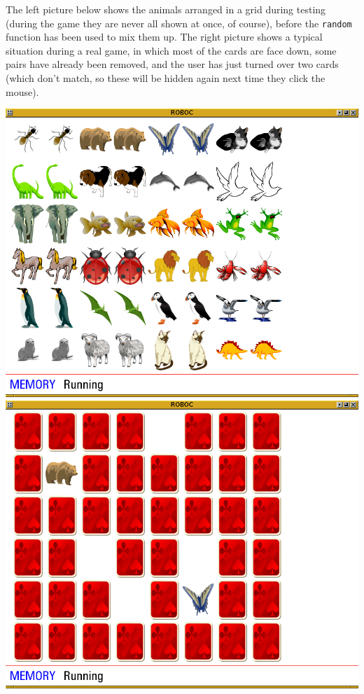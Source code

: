 \documentclass[12pt,a4paper,twoside]{article}
\renewcommand{\_}{\texttt{\symbol{95}}}
\begin{document}
The left picture below shows the animals arranged in a grid during testing
(during the game they are never all shown at once, of course), before
the \verb^random^ function has been used to mix them up. The right picture
shows a typical situation during a real game, in which most of the cards
are face down, some pairs have already been removed, and the user has
just turned over two cards (which don't match, so these will be hidden
again next time they click the mouse).

\begin{center}
\includegraphics[scale=0.32,angle=0]{screenshots/artpixel/memory/animal_grid}
\includegraphics[scale=0.32,angle=0]{screenshots/artpixel/memory/playing}\\
\end{center}
\end{document}
